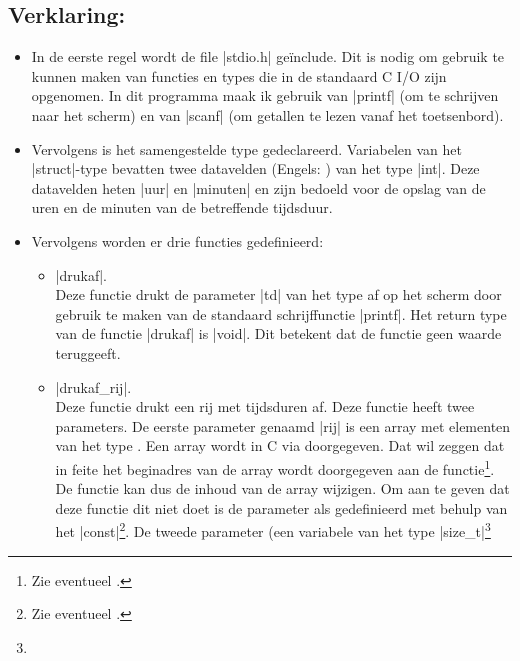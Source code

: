 \begin{clstShortInline}
\subsection*{Verklaring:}
\begin{itemize}
    \item 
    In de eerste regel wordt de file |stdio.h| geïnclude.
	Dit is nodig om gebruik te kunnen maken van functies en types die in de standaard C I/O  zijn opgenomen.
	In dit programma maak ik gebruik van |printf| (om te schrijven naar het scherm) en van |scanf| (om getallen te lezen vanaf het toetsenbord).
    \item 
    Vervolgens is het samengestelde type  gedeclareerd.
	Variabelen van het |struct|-type  bevatten twee datavelden (Engels: ) van het type |int|.
	Deze datavelden heten |uur| en |minuten| en zijn bedoeld voor de opslag van de uren en de minuten van de betreffende tijdsduur.
    \item 
    Vervolgens worden er drie functies gedefinieerd:
    \begin{itemize}
        \item |drukaf|.\\
		Deze functie drukt de parameter |td| van het type  af op het scherm door gebruik te maken van de standaard schrijffunctie |printf|.
		Het return type van de functie |drukaf| is |void|.
		Dit betekent dat de functie geen waarde teruggeeft.
        \item |drukaf_rij|.\\
		Deze functie drukt een rij met tijdsduren af.
		Deze functie heeft twee parameters.
		De eerste parameter genaamd |rij| is een array met elementen van het type .
		Een array wordt in C via  doorgegeven. Dat wil zeggen dat in feite het beginadres van de array wordt doorgegeven aan de functie\footnote{%
			Zie eventueel \cite[paragraaf 6.1.4]{Gustedt2019}.
		}.
		De functie kan dus de inhoud van de array wijzigen.
		Om aan te geven dat deze functie dit niet doet is de parameter als  gedefinieerd met behulp van het  |const|\footnote{%
			Zie eventueel \cite[takeaway 1.5.6.3]{Gustedt2019}.
		}.   
		De tweede parameter (een variabele van het type |size_t|\footnote{%
}
\end{itemize}
\end{itemize}
\end{clstShortInline}
